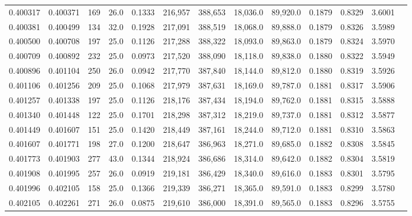\begin{tabular}{rrrrrrrrrrrrr}
0.400317 & 0.400371 &   169 & 26.0 &                                     0.1333 & 216,957 & 388,653 &  18,036.0 &  89,920.0 & 0.1879 & 0.8329 & 3.6001 \\
0.400381 & 0.400499 &   134 & 32.0 &                                     0.1928 & 217,091 & 388,519 &  18,068.0 &  89,888.0 & 0.1879 & 0.8326 & 3.5989 \\
0.400500 & 0.400708 &   197 & 25.0 &                                     0.1126 & 217,288 & 388,322 &  18,093.0 &  89,863.0 & 0.1879 & 0.8324 & 3.5970 \\
0.400709 & 0.400892 &   232 & 25.0 &                                     0.0973 & 217,520 & 388,090 &  18,118.0 &  89,838.0 & 0.1880 & 0.8322 & 3.5949 \\
0.400896 & 0.401104 &   250 & 26.0 &                                     0.0942 & 217,770 & 387,840 &  18,144.0 &  89,812.0 & 0.1880 & 0.8319 & 3.5926 \\
0.401106 & 0.401256 &   209 & 25.0 &                                     0.1068 & 217,979 & 387,631 &  18,169.0 &  89,787.0 & 0.1881 & 0.8317 & 3.5906 \\
0.401257 & 0.401338 &   197 & 25.0 &                                     0.1126 & 218,176 & 387,434 &  18,194.0 &  89,762.0 & 0.1881 & 0.8315 & 3.5888 \\
0.401340 & 0.401448 &   122 & 25.0 &                                     0.1701 & 218,298 & 387,312 &  18,219.0 &  89,737.0 & 0.1881 & 0.8312 & 3.5877 \\
0.401449 & 0.401607 &   151 & 25.0 &                                     0.1420 & 218,449 & 387,161 &  18,244.0 &  89,712.0 & 0.1881 & 0.8310 & 3.5863 \\
0.401607 & 0.401771 &   198 & 27.0 &                                     0.1200 & 218,647 & 386,963 &  18,271.0 &  89,685.0 & 0.1882 & 0.8308 & 3.5845 \\
0.401773 & 0.401903 &   277 & 43.0 &                                     0.1344 & 218,924 & 386,686 &  18,314.0 &  89,642.0 & 0.1882 & 0.8304 & 3.5819 \\
0.401908 & 0.401995 &   257 & 26.0 &                                     0.0919 & 219,181 & 386,429 &  18,340.0 &  89,616.0 & 0.1883 & 0.8301 & 3.5795 \\
0.401996 & 0.402105 &   158 & 25.0 &                                     0.1366 & 219,339 & 386,271 &  18,365.0 &  89,591.0 & 0.1883 & 0.8299 & 3.5780 \\
0.402105 & 0.402261 &   271 & 26.0 &                                     0.0875 & 219,610 & 386,000 &  18,391.0 &  89,565.0 & 0.1883 & 0.8296 & 3.5755 \\

\end{tabular}
